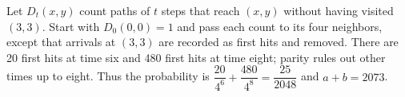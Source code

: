Let $D_t(x,y)$ count paths of $t$ steps that reach $(x,y)$ without having visited $(3,3)$. Start with $D_0(0,0)=1$ and pass each count to its four neighbors, except that arrivals at $(3,3)$ are recorded as first hits and removed. There are 20 first hits at time six and 480 first hits at time eight; parity rules out other times up to eight. Thus the probability is $\dfrac{20}{4^6}+\dfrac{480}{4^8}=\dfrac{25}{2048}$ and $\boxed{a+b=2073}$.
